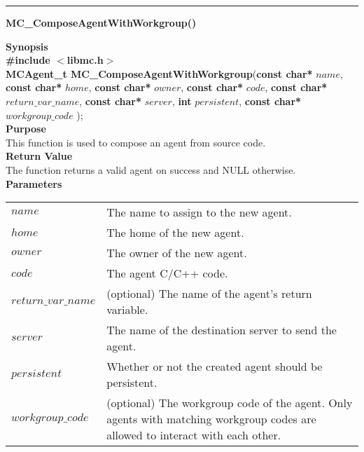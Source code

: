 \noindent
\vspace{5pt}
\rule{6.5in}{0.015in}
\noindent
{}
{\LARGE \bf MC\_ComposeAgentWithWorkgroup()}\\

\noindent
{\bf Synopsis}\\
{\bf \#include $<$libmc.h$>$}\\
{\bf MCAgent\_t MC\_ComposeAgentWithWorkgroup}({\bf const char*} $name$, 
                                  {\bf const char*} $home$,
                                  {\bf const char*} $owner$,
                                  {\bf const char*} $code$,
                                  {\bf const char*} $return\_var\_name$,
                                  {\bf const char*} $server$,
                                  {\bf int} $persistent$,
                                  {\bf const char*} $workgroup\_code$
																	);\\

\noindent
{\bf Purpose}\\
This function is used to compose an agent from source code.\\

\noindent
{\bf Return Value}\\
The function returns a valid agent on success and NULL otherwise.\\

\noindent
{\bf Parameters}
\vspace{-0.1in}
\begin{description}
\item
\begin{tabular}{p{30 mm}p{125 mm}} 
$name$ & The name to assign to the new agent.\\
$home$ & The home of the new agent.\\
$owner$ & The owner of the new agent.\\
$code$ & The agent C/C++ code.\\
$return\_var\_name$ & (optional) The name of the agent's return variable.\\
$server$ & The name of the destination server to send the agent.\\
$persistent$ & Whether or not the created agent should be persistent.\\
$workgroup\_code$ & (optional) The workgroup code of the agent. Only agents with matching workgroup codes are allowed to interact with each other.\\
\end{tabular}
\end{description}

